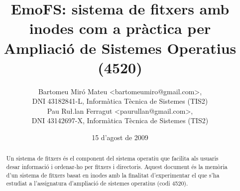 \documentclass[a4paper, onecolumn, 12pt, final]{article}
\title{EmoFS: sistema de fitxers amb inodes com a pràctica per Ampliació de
  Sistemes Operatius (4520)}
\author{Bartomeu Miró Mateu <bartomeumiro@gmail.com>, \\
  DNI 43182841-L, Informàtica Tècnica de Sistemes (TIS2)\\
        Pau Ru\l.lan Ferragut <paurullan@gmail.com>, \\
  DNI 43142697-X, Informàtica Tècnica de Sistemes (TIS2) }
\date{15 d'agost de 2009}
\begin{document}
\maketitle

\begin{abstract}
Un sistema de fitxers és el component del sistema operatiu que facilita als
usuaris desar informació i ordenar-ho per fitxers i directoris. Aquest document
és la memòria d'un sistema de fitxers basat en inodes amb la finalitat
d'experimentar el que s'ha estudiat a l'assignatura d'ampliació de sistemes
operatius (codi 4520).
\end{abstract}








\appendix


\newpage
\tableofcontents
\end{document}
